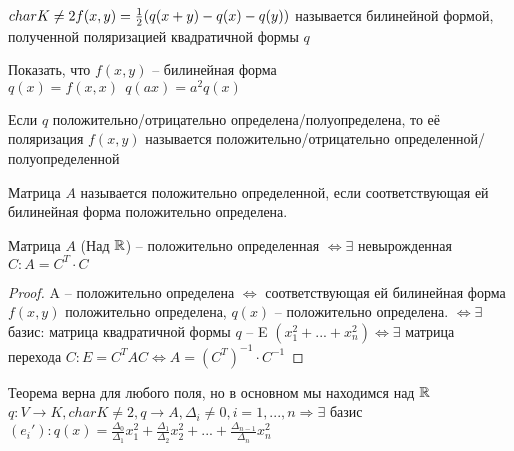 \begin{Def} 
	$char K \neq 2\\
	f(x,y) = \frac{1}{2} (q(x+y) - q(x) - q(y))$ называется билинейной формой, полученной поляризацией квадратичной формы $q$
\end{Def} 

\begin{Ex}
	Показать, что $f(x, y)$ -- билинейная форма\\
	$q(x) = f(x,x) \ \ q(ax) = a^2 q(x)$
\end{Ex}

\begin{Def} 
	Если $q$ положительно/отрицательно определена/полуопределена, то её поляризация $f(x, y)$ называется положительно/отрицательно определенной/полуопределенной 
\end{Def} 

\begin{Def}
	Матрица $A$ называется положительно определенной, если соответствующая ей билинейная форма положительно определена. 
\end{Def}

\begin{Thm} 
	Матрица $A$ (Над $\mathbb{R}$) -- положительно определенная $\Leftrightarrow \exists$ невырожденная $C: A = C^T \cdot C$
\end{Thm} 

\begin{proof}
	A -- положительно определена $\Leftrightarrow$ соответствующая ей билинейная форма $f(x,y)$ положительно определена,  $q(x)$ -- положительно определена.
	$\Leftrightarrow \exists$ базис: матрица квадратичной формы $q$ -- E $(x^2_1 + ... + x^2_n) \Leftrightarrow \exists$ матрица перехода $C: E = C^TAC \Leftrightarrow A = (C^T)^{-1} \cdot C^{-1}$ 
\end{proof}

\begin{Thm} 
	Теорема верна для любого поля, но в основном мы находимся над $\mathbb{R}$\\
	$q: V \to K, char K \neq 2, q \to A, \Delta_i \neq 0, i = 1, ..., n  \Rightarrow \exists$ базис $(e_i'): q(x) = \frac{\Delta_0}{\Delta_1} x_1^2 + \frac{\Delta_1}{\Delta_2} x_2^2 + ... + \frac{\Delta_{n-1}}{\Delta_n} x^2_n$\\
\end{Thm} 

